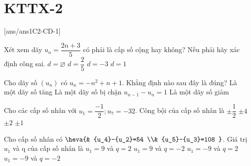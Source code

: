 \section*{KTTX-2}
\setcounter{ex}{0}\setcounter{bt}{0}
[ans/ans1C2-CD-1]
\setcounter{ex}{0}
\begin{ex}%
Xét xem dãy $u_{n}=\dfrac{2 n+3}{5}$ có phải là cấp số cộng hay không? Nếu phải hãy xác định công sai.
\choice
{$d=\varnothing$}
{\True$d=\dfrac{2}{5}$}
{$d=-3$}
{$d=1$}
\end{ex}

\begin{ex}%
Cho dãy số $\left(u_{n}\right)$ có $u_{n}=-n^{2}+n+1$. Khẳng định nào sau đây là đúng?
\choice
{Là một dãy số tăng}
{Là một dãy số bị chặn}
{$u_{n-1}-u_{n}=1$}
{\True Là một dãy số giảm}
\end{ex}

\begin{ex}%
Cho các cấp số nhân với $u_1=\dfrac{-1}{2};{u_7}=-32$. Công bội của cấp số nhân là
\choice
{$\pm \dfrac{1}{2}$}
{ $\pm 4$}
{\True$\pm 2$}
{$\pm 1$}
\end{ex}


\begin{ex}%
Cho cấp số nhân có $\heva{&
{u_4}-{u_2}=54 \\&
{u_5}-{u_3}=108 }$. Giá trị ${u_1}$ và q của cấp số nhân là
\choice
{\True $u_1=9$ và $q=2$}
{$u_1=9$ và $q=-2$}
{$u_1=-9$ và $q=2$}
{$u_1=-9$ và $q=-2$}
\end{ex}

